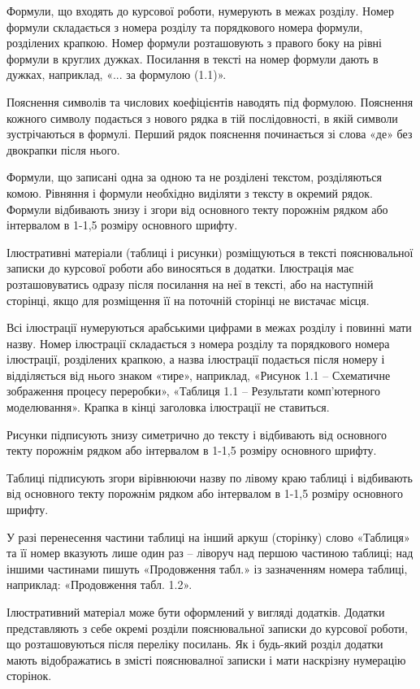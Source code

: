 Формули, що входять до курсової роботи, нумерують в межах розділу. Номер формули складається з номера розділу та порядкового номера формули, розділених крапкою. Номер формули розташовують з правого боку на рівні формули в круглих дужках. Посилання в тексті на номер формули дають в дужках, наприклад, «... за формулою (1.1)».

Пояснення символів та числових коефіцієнтів наводять під формулою. Пояснення кожного символу подається з нового рядка в тій послідовності, в якій символи зустрічаються в формулі. Перший рядок пояснення починається зі слова «де» без двокрапки після нього. 

Формули, що записані одна за одною та не розділені текстом, розділяються комою. Рівняння і формули необхідно виділяти з тексту в окремий рядок. Формули відбивають знизу і згори від основного текту порожнім рядком або інтервалом в 1-1,5 розміру основного шрифту.

Ілюстративні матеріали (таблиці і рисунки) розміщуються в тексті пояснювальної записки до курсової роботи або виносяться в додатки. Ілюстрація має розташовуватись одразу після посилання на неї в тексті, або на наступній сторінці, якщо для розміщення її на поточній сторінці не вистачає місця.

Всі ілюстрації нумеруються арабськими цифрами в межах розділу і повинні мати назву. Номер ілюстрації складається з номера розділу та порядкового номера ілюстрації, розділених крапкою, а назва ілюстрації подається після номеру і відділяється від нього знаком «тире», наприклад, «Рисунок 1.1 -- Схематичне зображення процесу переробки», «Таблиця 1.1 -- Результати комп'ютерного моделювання». Крапка в кінці заголовка ілюстрації не ставиться.

Рисунки підписують знизу симетрично до тексту і відбивають від основного текту порожнім рядком або інтервалом в 1-1,5 розміру основного шрифту.

Таблиці підписують згори вірівнюючи назву по лівому краю таблиці і відбивають від основного текту порожнім рядком або інтервалом в 1-1,5 розміру основного шрифту.

У разі перенесення частини таблиці на інший аркуш (сторінку) слово «Таблиця» та її номер вказують лише один раз -- ліворуч над першою частиною таблиці; над іншими частинами пишуть «Продовження табл.» із зазначенням номера таблиці, наприклад: «Продовження табл. 1.2».

Ілюстративний матеріал може бути оформлений у вигляді додатків. Додатки представляють з себе окремі розділи пояснювальної записки до курсової роботи, що розташовуються після переліку посилань. Як і будь-який розділ додатки мають відображатись в змісті пояснювалної записки і мати наскрізну нумерацію сторінок.

